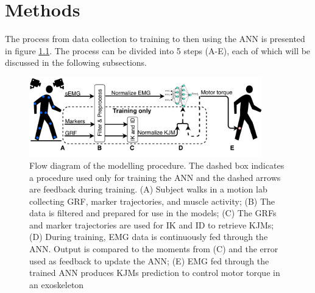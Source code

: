 \documentclass[../main.tex]{subfiles}
\begin{document}
\chapter{Methods}
\label{sec:methods}
The process from data collection to training to then using the \ac{ANN} is presented in figure \ref{fig:process-diagram}. 
The process can be divided into 5 steps (A-E), each of which will be discussed in the following subsections.
\begin{figure}[ht]
    \centering
    \includegraphics[width=0.9\textwidth]{img/ProcessDiagram}
    \caption{Flow diagram of the modelling procedure. The dashed box indicates a procedure used only for training the \ac{ANN} and the dashed arrows are feedback during training. (A) Subject walks in a motion lab collecting \acf{GRF}, marker trajectories, and muscle activity; (B) The data is filtered and prepared for use in the models; (C) The \acp{GRF} and marker trajectories are used for \ac{IK} and \ac{ID} to retrieve \acp{KJM}; (D) During training, \ac{EMG} data is continuously fed through the \ac{ANN}. Output is compared to the moments from (C) and the error used as feedback to update the \ac{ANN}; (E) \ac{EMG} fed through the trained \ac{ANN} produces \acp{KJM} prediction to control motor torque in an exoskeleton}
    \label{fig:process-diagram}
\end{figure}
\end{document}
